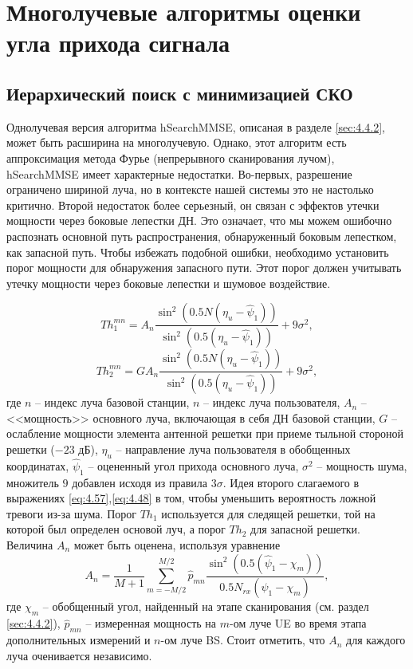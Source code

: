 \section{Многолучевые алгоритмы оценки угла прихода сигнала}
\subsection{Иерархический поиск с минимизацией СКО}

Однолучевая версия алгоритма hSearchMMSE, описаная в разделе \ref{sec:4.4.2},
может быть расширина на многолучевую.  Однако, этот алгоритм есть аппроксимация
метода Фурье (непрерывного сканирования лучом), hSearchMMSE имеет характерные
недостатки.  Во-первых, разрешение ограничено шириной луча, но в контексте нашей
системы это не настолько критично. Второй недостаток более серьезный, он связан
с эффектов утечки мощности через боковые лепестки ДН.  Это означает, что мы
можем ошибочно распознать основной путь распространения, обнаруженный боковым
лепестком, как запасной путь.  Чтобы избежать подобной ошибки, необходимо
установить порог мощности для обнаружения запасного пути. Этот порог должен
учитывать утечку мощности через боковые лепестки и шумовое воздействие.

\begin{equation}
    \label{eq:4.57}
    Th_1^{mn} = A_n \frac{\sin^2(0.5 N (\eta_u - \hat \psi_1))}{\sin^2(0.5 (\eta_u - \hat \psi_1))} + 9 \sigma^2,
\end{equation}
\begin{equation}
    \label{eq:4.58}
    Th_2^{mn} = G A_n \frac{\sin^2(0.5 N (\eta_u - \hat \psi_1))}{\sin^2(0.5 (\eta_u - \hat \psi_1))} + 9 \sigma^2,
\end{equation}
где $n$ -- индекс луча базовой станции, $n$ -- индекс луча пользователя, $A_n$
-- <<мощность>> основного луча, включающая в себя ДН базовой станции, $G$ --
ослабление мощности элемента антенной решетки при приеме тыльной стороной
решетки ($-23$ дБ), $\eta_u$ -- направление луча пользователя в обобщенных
координатах, $\hat \psi_1$ -- оцененный угол прихода основного луча, $\sigma^2$
-- мощность шума, множитель $9$ добавлен исходя из правила $3\sigma$. Идея второго слагаемого в выражениях \eqref{eq:4.57},\eqref{eq:4.48} в том, чтобы 
уменьшить вероятность ложной тревоги из-за шума. Порог $Th_1$ используется для следящей решетки, той на которой был определен основой луч, а порог $Th_2$ для запасной решетки.
Величина $A_n$ может быть оценена, используя уравнение 
\begin{equation}
    A_n = \frac{1}{M+1} \sum\limits_{m=-M/2}^{M/2} \hat p_{mn} 
    \frac{\sin^2(0.5(\hat \psi_1 - \chi_m))}{0.5 N_{rx}(\hat \psi_1 - \chi_m)},
\end{equation}
где $\chi_m$ -- обобщенный угол, найденный на этапе сканирования (см. раздел \eqref{sec:4.4.2}), $\hat p_{mn}$ -- 
измеренная мощность на $m$-ом луче UE во время этапа дополнительных измерений и $n$-ом луче BS. Стоит отметить, что $A_n$ для каждого луча оченивается независимо. 

